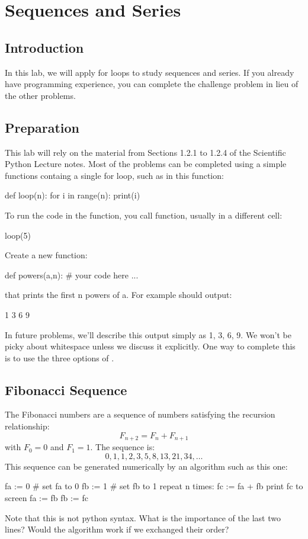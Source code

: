 \chapter{Sequences and Series}

\section{Introduction}

In this lab, we will apply for loops to study sequences and series.
If you already have programming experience, you can complete the
challenge problem in lieu of the other problems.

\section{Preparation}

This lab will rely on the material from Sections 1.2.1 to 1.2.4 of the
Scientific Python Lecture notes.  Most of the problems can be
completed using a simple functions containg a single for loop, such as
in this function:
\begin{python}
  def loop(n):
    for i in range(n):
        print(i)
\end{python}
To run the code in the function, you call function, usually in a different cell:
\begin{python}
loop(5)
\end{python}

\vskip 0.25cm
\plot Create a new function:
\begin{python}
def powers(a,n):
   # your code here ...
\end{python}
that prints the first n powers of a.  For example  should output:
\begin{python}
1
3
6
9
\end{python}
In future problems, we'll describe this output simply as 1, 3, 6, 9.
We won't be picky about whitespace unless we discuss it explicitly.
One way to complete this is to use the three options of
.

\section{Fibonacci Sequence}

The Fibonacci numbers are a sequence of numbers satisfying the
recursion relationship:
\begin{displaymath}
F_{n+2} = F_{n} + F_{n+1}
\end{displaymath}
with $F_0=0$ and $F_1=1$.  The sequence is:
\begin{displaymath}
0, 1, 1, 2, 3, 5, 8, 13, 21, 34, \ldots
\end{displaymath}
This sequence can be generated numerically by an algorithm such as this one:
\begin{algorithm}
fa := 0 # set fa to 0
fb := 1 # set fb to 1
repeat n times: 
   fc := fa + fb
   print fc to screen
   fa := fb
   fb := fc
\end{algorithm}
Note that this is not python syntax.  What is the importance of the
last two lines?  Would the algorithm work if we exchanged their order?\\

